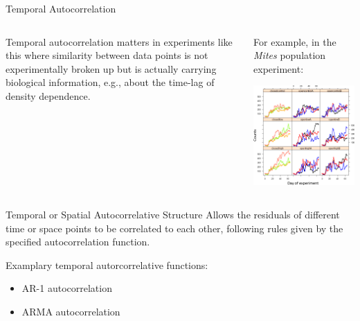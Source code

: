 \documentclass{beamer}
\begin{document}
\begin{frame}{Temporal Autocorrelation}
\begin{columns}
    \begin{column}{0.5\textwidth}
    Temporal autocorrelation matters in experiments like this where similarity between data points is not experimentally broken up but is actually carrying biological information, e.g., about the time-lag of density dependence. 
    \end{column}
    \begin{column}{0.5\textwidth}
    \centering
    For example, in the \textit{Mites} population experiment:
    \vspace{0.5cm}
    
    \includegraphics[width=\textwidth]{lectures/day_4_GLS/figures/counts.png}
    \end{column}
\end{columns}
\end{frame}



\begin{frame}{Temporal or Spatial Autocorrelative Structure}
  Allows the residuals of different time or space points to be correlated to each other, following rules given by the specified autocorrelation function.
  \vspace{0.5cm}

  Examplary temporal autorcorrelative functions:
  \begin{itemize}
    \item AR-1 autocorrelation
    \item ARMA autocorrelation
  \end{itemize}
\end{frame}
\end{document}
